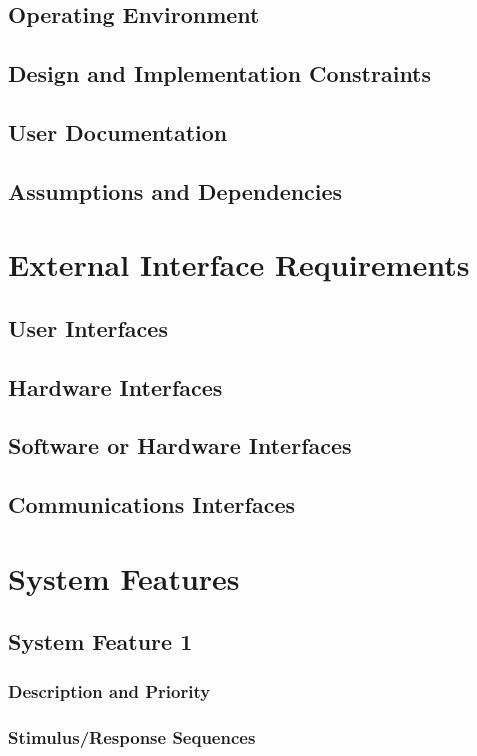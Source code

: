 \documentclass[english]{article}
\numberwithin{equation}{section} %
\begin{document}
\subsection{Operating Environment}
\subsection{Design and Implementation Constraints}
\subsection{User Documentation}
\subsection{Assumptions and Dependencies}

\newpage
\section{External Interface Requirements}
\subsection{User Interfaces}
\subsection{Hardware Interfaces}
\subsection{Software or Hardware Interfaces}
\subsection{Communications Interfaces}

\newpage
\section{System Features}
\subsection{System Feature 1}
\subsubsection{Description and Priority}
\subsubsection{Stimulus/Response Sequences}
\end{document}
